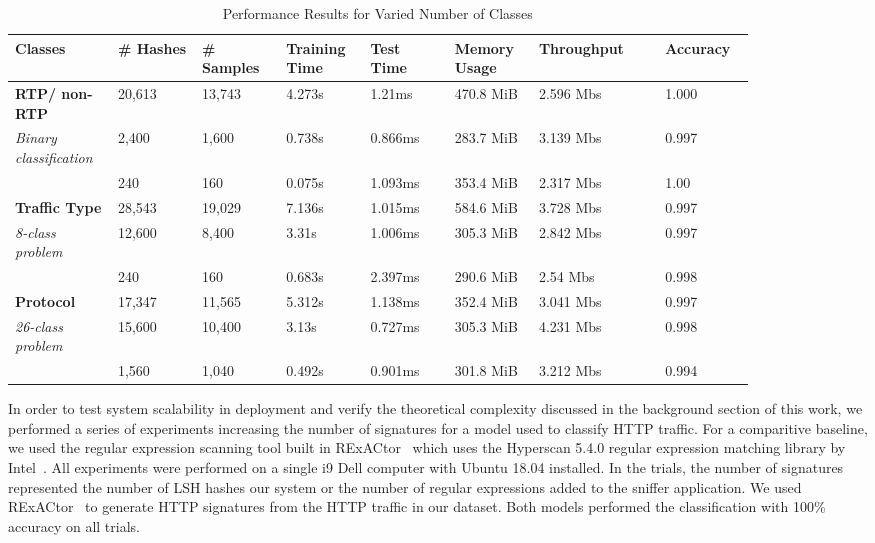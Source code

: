 \begin{table} [ht!]
\caption{Performance Results for Varied Number of Classes}
\centering
\begin{tabular}{| p{0.11\linewidth} | p{0.1\linewidth} | p{0.1\linewidth} | p{0.1\linewidth} | p{0.1\linewidth} | p{0.1\linewidth} | p{0.15\linewidth} | p{0.1\linewidth} |}
\hline
Classes & \# Hashes & \# Samples & Training Time & Test Time & Memory Usage & Throughput & Accuracy \\
\hline
\hline
\textbf{RTP/ non-RTP} & 20,613 & 13,743 & 4.273s & 1.21ms & 470.8 MiB & 2.596 Mb\/s & 1.000 \\
\textit{Binary classification} & 2,400 & 1,600 & 0.738s & 0.866ms & 283.7 MiB & 3.139 Mb\/s & 0.997 \\
& 240 & 160 & 0.075s & 1.093ms & 353.4 MiB & 2.317 Mb\/s & 1.00 \\
\hline
\textbf{Traffic Type} & 28,543 & 19,029 & 7.136s & 1.015ms & 584.6 MiB & 3.728 Mb\/s & 0.997 \\
\textit{8-class problem} & 12,600 & 8,400 & 3.31s & 1.006ms & 305.3 MiB & 2.842 Mb\/s & 0.997 \\
& 240 & 160 & 0.683s & 2.397ms & 290.6 MiB & 2.54 Mb\/s & 0.998 \\
\hline
\textbf{Protocol} & 17,347 & 11,565 & 5.312s & 1.138ms & 352.4 MiB & 3.041 Mb\/s & 0.997 \\
\textit{26-class problem} & 15,600 & 10,400 & 3.13s & 0.727ms & 305.3 MiB & 4.231 Mb\/s & 0.998 \\
& 1,560 & 1,040 & 0.492s & 0.901ms & 301.8 MiB & 3.212 Mb\/s & 0.994 \\
\hline
\end{tabular}
\label{table:performanceresults}
\end{table}

In order to test system scalability in deployment and verify the theoretical complexity discussed in the background section of this work, we performed a series of experiments increasing the number of signatures for a model used to classify HTTP traffic. For a comparitive baseline, we used the regular expression scanning tool built in RExACtor~\cite{rexactor} which uses the Hyperscan 5.4.0 regular expression matching library by Intel~\cite{hyperscan}. All experiments were performed on a single i9 Dell computer with Ubuntu 18.04 installed. In the trials, the number of signatures represented the number of LSH hashes our system or the number of regular expressions added to the sniffer application. We used RExACtor~\cite{rexactor} to generate HTTP signatures from the HTTP traffic in our dataset. Both models performed the classification with 100\% accuracy on all trials.

